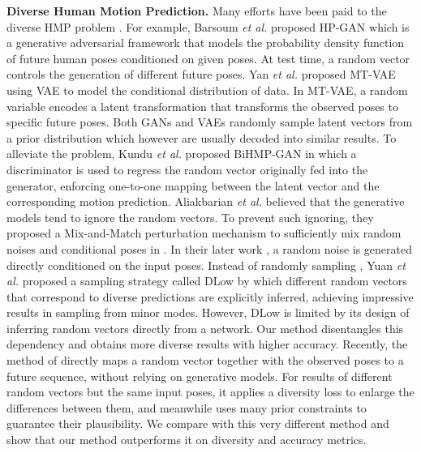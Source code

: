\documentclass[sigconf,screen,nonacm]{acmart}
\begin{document}
	\textbf{Diverse Human Motion Prediction.} Many efforts have been paid to the diverse HMP problem \cite{barsoum2018hp,yan2018mt,kundu2019bihmp,yuan2020dlow,aliakbarian2020stochastic,liu2021aggregated,tanke2021intention,lyu2021learning,mao2021generating,aliakbarian2021contextually,cai2021unified}. For example, Barsoum \textit{et al.} \cite{barsoum2018hp} proposed HP-GAN which is a generative adversarial framework that models the probability density function of future human poses conditioned on given poses. At test time, a random vector  controls the generation of different future poses. Yan \textit{et al.} \cite{yan2018mt} proposed MT-VAE using VAE \cite{kingma2013auto, Liu:ICCV2021} to model the conditional distribution of data. In MT-VAE, a random variable  encodes a latent transformation that transforms the observed poses to specific future poses. Both GANs and VAEs randomly sample latent vectors  from a prior distribution which however are usually decoded into similar results. To alleviate the problem, Kundu \textit{et al.} \cite{kundu2019bihmp} proposed BiHMP-GAN in which a discriminator is used to regress the random vector  originally fed into the generator, enforcing one-to-one mapping between the latent vector  and the corresponding motion prediction. Aliakbarian \textit{et al.} \cite{aliakbarian2020stochastic} believed that the generative models tend to ignore the random vectors. To prevent such ignoring, they proposed a Mix-and-Match perturbation mechanism to sufficiently mix random noises and conditional poses in \cite{aliakbarian2020stochastic}. In their later work \cite{aliakbarian2021contextually}, a random noise is generated directly conditioned on the input poses. Instead of randomly sampling , Yuan \textit{et al.} \cite{yuan2020dlow} proposed a sampling strategy called DLow by which different random vectors that correspond to diverse predictions are explicitly inferred, achieving impressive results in sampling from minor modes. However, DLow is limited by its design of inferring random vectors directly from a network. Our method disentangles this dependency and obtains more diverse results with higher accuracy. Recently, the method of \cite{mao2021generating} directly maps a random vector together with the observed poses to a future sequence, without relying on generative models. For results of different random vectors but the same input poses, it applies a diversity loss to enlarge the differences between them, and meanwhile uses many prior constraints to guarantee their plausibility. We compare with this very different method and show that our method outperforms it on diversity and accuracy metrics.
	
\end{document}
